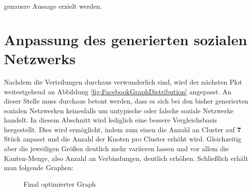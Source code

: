 genauere Aussage erzielt werden. 


\section{Anpassung des generierten sozialen Netzwerks}
Nachdem die Verteilungen durchaus verwunderlich sind, wird der nächsten Plot weitestgehend an Abbildung \ref{fig:FacebookGraphDistribution} angepasst. An dieser Stelle muss durchaus betont werden, dass es sich bei den bisher generierten sozialen Netzwerken keinesfalls um untypische oder falsche soziale Netzwerke handelt. In diesem Abschnitt wird lediglich eine bessere Vergleichsbasis hergestellt. Dies wird ermöglicht, indem zum einen die Anzahl an Cluster auf \textbf{7} Stück anpasst und die Anzahl der Knoten pro Cluster erhöht wird. Gleichzeitig aber die jeweiligen Größen deutlich mehr variieren lassen und vor allem die Kanten-Menge, also Anzahl an Verbindungen, deutlich erhöhen. Schließlich erhält man folgende Graphen: 

\FloatBarrier
\begin{figure}[h!]%
  \centering
  \qquad
  \caption{Final optimierter Graph}
  \label{fig:ourGraphFinalPlot}
\end{figure}
\FloatBarrier

